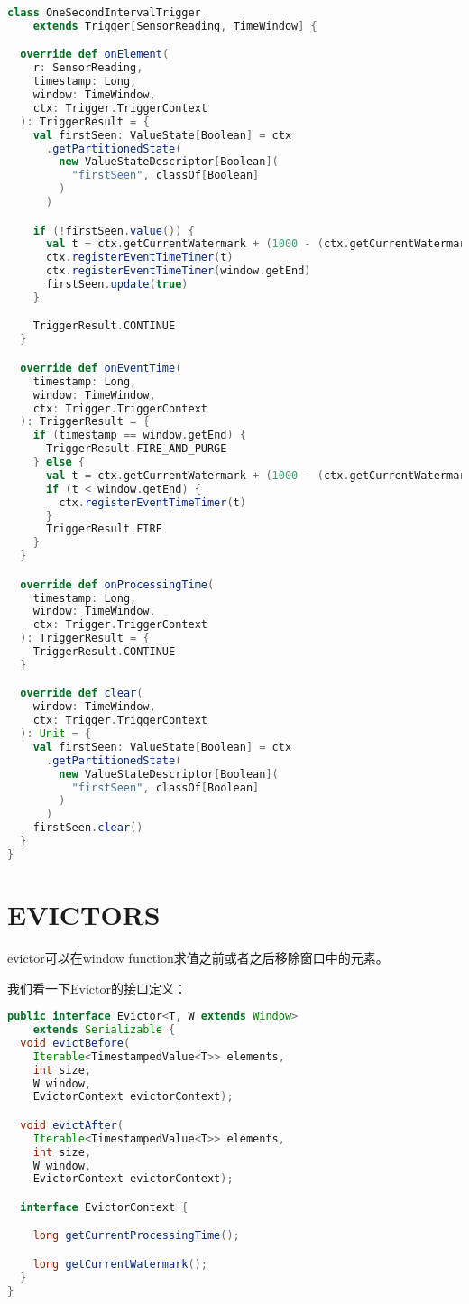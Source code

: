 \documentclass[oneside]{ctexbook}
\begin{document}
\begin{lstlisting}[language=scala]
class OneSecondIntervalTrigger
    extends Trigger[SensorReading, TimeWindow] {

  override def onElement(
    r: SensorReading,
    timestamp: Long,
    window: TimeWindow,
    ctx: Trigger.TriggerContext
  ): TriggerResult = {
    val firstSeen: ValueState[Boolean] = ctx
      .getPartitionedState(
        new ValueStateDescriptor[Boolean](
          "firstSeen", classOf[Boolean]
        )
      )

    if (!firstSeen.value()) {
      val t = ctx.getCurrentWatermark + (1000 - (ctx.getCurrentWatermark % 1000))
      ctx.registerEventTimeTimer(t)
      ctx.registerEventTimeTimer(window.getEnd)
      firstSeen.update(true)
    }

    TriggerResult.CONTINUE
  }

  override def onEventTime(
    timestamp: Long,
    window: TimeWindow,
    ctx: Trigger.TriggerContext
  ): TriggerResult = {
    if (timestamp == window.getEnd) {
      TriggerResult.FIRE_AND_PURGE
    } else {
      val t = ctx.getCurrentWatermark + (1000 - (ctx.getCurrentWatermark % 1000))
      if (t < window.getEnd) {
        ctx.registerEventTimeTimer(t)
      }
      TriggerResult.FIRE
    }
  }

  override def onProcessingTime(
    timestamp: Long,
    window: TimeWindow,
    ctx: Trigger.TriggerContext
  ): TriggerResult = {
    TriggerResult.CONTINUE
  }

  override def clear(
    window: TimeWindow,
    ctx: Trigger.TriggerContext
  ): Unit = {
    val firstSeen: ValueState[Boolean] = ctx
      .getPartitionedState(
        new ValueStateDescriptor[Boolean](
          "firstSeen", classOf[Boolean]
        )
      )
    firstSeen.clear()
  }
}
\end{lstlisting}

\section{EVICTORS}

evictor可以在window function求值之前或者之后移除窗口中的元素。

我们看一下Evictor的接口定义：

\begin{lstlisting}[language=java]
public interface Evictor<T, W extends Window>
    extends Serializable {
  void evictBefore(
    Iterable<TimestampedValue<T>> elements,
    int size,
    W window,
    EvictorContext evictorContext);

  void evictAfter(
    Iterable<TimestampedValue<T>> elements,
    int size,
    W window,
    EvictorContext evictorContext);

  interface EvictorContext {

    long getCurrentProcessingTime();

    long getCurrentWatermark();
  }
}
\end{lstlisting}
\end{document}
